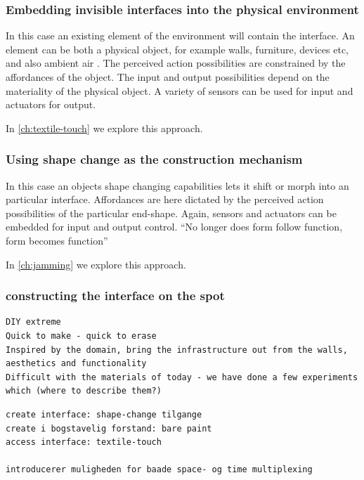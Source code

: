 \subsubsection{Embedding invisible interfaces into the physical environment}

In this case an existing element of the environment will contain the interface.
An element can be both a physical object, for example walls, furniture, devices etc, and also ambient air .
The perceived action possibilities are constrained by the affordances of the object. 
The input and output possibilities depend on the materiality of the physical object.
A variety of sensors can be used for input and actuators for output.

In \autoref{ch:textile-touch} we explore this approach.

\subsubsection{Using shape change as the construction mechanism}

In this case an objects shape changing capabilities lets it shift or morph into an particular interface.
Affordances are here dictated by the perceived action possibilities of the particular end-shape.
Again, sensors and actuators can be embedded for input and output control.
``No longer does form follow function, form becomes function''

In \autoref{ch:jamming} we explore this approach.

\subsubsection{constructing the interface on the spot}
\begin{verbatim}
DIY extreme
Quick to make - quick to erase
Inspired by the domain, bring the infrastructure out from the walls, aesthetics and functionality
Difficult with the materials of today - we have done a few experiments which (where to describe them?)
\end{verbatim}

\begin{verbatim}
create interface: shape-change tilgange
create i bogstavelig forstand: bare paint
access interface: textile-touch

introducerer muligheden for baade space- og time multiplexing
\end{verbatim}

